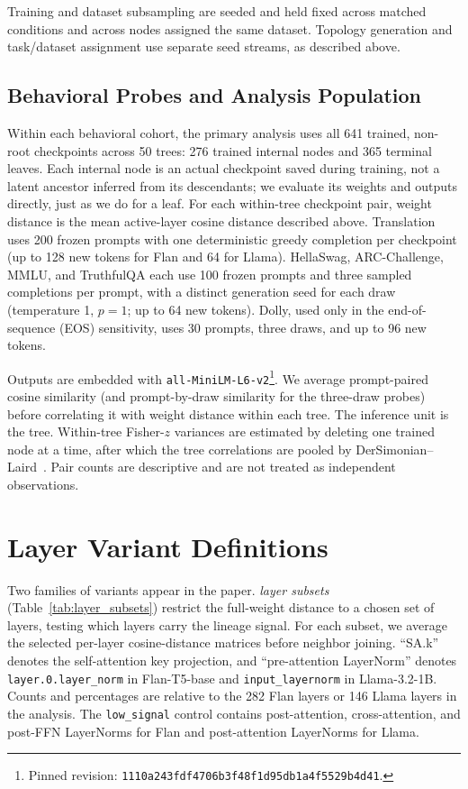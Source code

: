\documentclass{article}
\theoremstyle{definition}
\theoremstyle{plain}
\begin{document}
Training and dataset subsampling are seeded and held fixed across matched conditions and across
nodes assigned the same dataset. Topology generation and task/dataset assignment use separate seed
streams, as described above.

\subsection*{Behavioral Probes and Analysis Population}
Within each behavioral cohort, the primary analysis uses all 641 trained, non-root checkpoints
across 50 trees: 276 trained internal nodes and 365 terminal leaves. Each internal node is an actual
checkpoint saved during training, not a latent ancestor inferred from its descendants; we evaluate
its weights and outputs directly, just as we do for a leaf. For each within-tree checkpoint pair, weight distance is the mean
active-layer cosine distance described above. Translation uses 200 frozen prompts with one
deterministic greedy completion per checkpoint (up to 128 new tokens for Flan and 64 for Llama).
HellaSwag, ARC-Challenge, MMLU, and TruthfulQA
each use 100 frozen prompts and three sampled completions per prompt, with a distinct generation seed
for each draw (temperature 1, $p=1$; up to 64 new tokens). Dolly, used only in the
end-of-sequence (EOS) sensitivity, uses 30 prompts, three draws, and up to 96 new tokens.

Outputs are embedded with \texttt{all-MiniLM-L6-v2}\footnote{Pinned revision:
\nolinkurl{1110a243fdf4706b3f48f1d95db1a4f5529b4d41}.}. We average prompt-paired cosine similarity (and
prompt-by-draw similarity for the three-draw probes) before correlating it with weight distance within
each tree. The inference unit is the tree. Within-tree Fisher-$z$ variances are estimated by deleting one
trained node at a time, after which the tree correlations are pooled by
DerSimonian--Laird~\citep{dersimonianlaird1986}. Pair counts are descriptive and are not treated as
independent observations.

\section{Layer Variant Definitions}
\label{app:layers}
Two families of variants appear in the paper. \emph{layer subsets} (Table~\ref{tab:layer_subsets})
restrict the full-weight distance to a chosen set of layers, testing which layers carry the lineage
signal. For each subset, we average the selected per-layer cosine-distance matrices before neighbor
joining. ``SA.k'' denotes the self-attention key projection, and ``pre-attention LayerNorm'' denotes
\texttt{layer.0.layer\_norm} in Flan-T5-base and \texttt{input\_layernorm} in Llama-3.2-1B.
Counts and percentages are relative to the 282 Flan layers or 146 Llama layers in the analysis.
The \texttt{low\_signal} control contains post-attention, cross-attention, and post-FFN LayerNorms
for Flan and post-attention LayerNorms for Llama.
\end{document}
